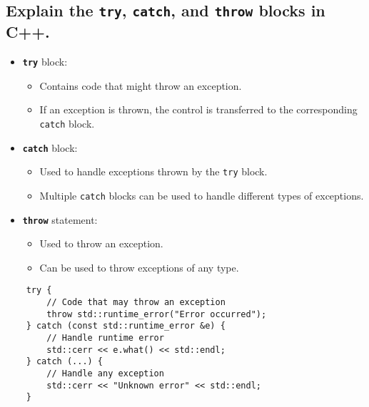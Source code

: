 \subsection{Explain the \texttt{try}, \texttt{catch}, and \texttt{throw} blocks in C++.}
\begin{itemize}
    \item \textbf{\texttt{try}} block:
    \begin{itemize}
        \item Contains code that might throw an exception.
        \item If an exception is thrown, the control is transferred to the corresponding \texttt{catch} block.
    \end{itemize}
    
    \item \textbf{\texttt{catch}} block:
    \begin{itemize}
        \item Used to handle exceptions thrown by the \texttt{try} block.
        \item Multiple \texttt{catch} blocks can be used to handle different types of exceptions.
    \end{itemize}
    
    \item \textbf{\texttt{throw}} statement:
    \begin{itemize}
        \item Used to throw an exception.
        \item Can be used to throw exceptions of any type.
    \end{itemize}
\end{itemize}
\begin{tcolorbox}[title=Exception Handling]
\begin{verbatim}
    try {
        // Code that may throw an exception
        throw std::runtime_error("Error occurred");
    } catch (const std::runtime_error &e) {
        // Handle runtime error
        std::cerr << e.what() << std::endl;
    } catch (...) {
        // Handle any exception
        std::cerr << "Unknown error" << std::endl;
    }
\end{verbatim}        
\end{tcolorbox}

